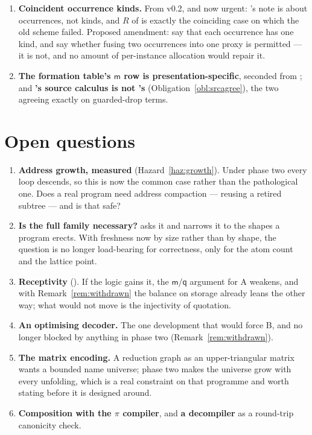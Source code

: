 \documentclass[11pt,a4paper]{article}
\newcommand{\mm}{\mathsf{m}}
\newcommand{\qq}{\mathsf{q}}
\theoremstyle{definition}
\theoremstyle{plain}
\begin{document}
\begin{enumerate}[leftmargin=1.8em]
\item \textbf{Coincident occurrence kinds.} From v0.2, and now urgent:
\cite[Table~1]{draft3}'s note is about occurrences, not kinds, and $R$ of
\cite[\S6.1]{draft3} is exactly the coinciding case on which the old scheme
failed. Proposed amendment: say that each occurrence has one kind, and say
whether fusing two occurrences into one proxy is permitted --- it is not, and
no amount of per-instance allocation would repair it.

\item \textbf{The formation table's $\mm$ row is presentation-specific},
seconded from \cite[Rem.~2.6]{logic}; and
\textbf{\cite[\S2]{draft3}'s source calculus is not
\cite[Def.~2.6]{k1ndl1ng}'s} (Obligation~\ref{obl:srcagree}), the two agreeing
exactly on guarded-drop terms.

\end{enumerate}

\section{Open questions}

\begin{enumerate}[leftmargin=1.8em]
\item \textbf{Address growth, measured} (Hazard~\ref{haz:growth}). Under phase
two every loop descends, so this is now the common case rather than the
pathological one. Does a real program need address compaction --- reusing a
retired subtree --- and is that safe?
\item \textbf{Is the full family necessary?} \cite[\S12]{draft3} asks it and
\cite[Rem.~6.15]{draft3} narrows it to the shapes a program erects. With
freshness now by size rather than by shape, the question is no longer
load-bearing for correctness, only for the atom count and the lattice point.
\item \textbf{Receptivity} (\cite[open item~5]{logic}). If the logic gains it,
the $\mm$/$\qq$ argument for A weakens, and with
Remark~\ref{rem:withdrawn} the balance on storage already leans the other way;
what would not move is the injectivity of quotation.
\item \textbf{An optimising decoder.} The one development that would force B,
and no longer blocked by anything in phase two (Remark~\ref{rem:withdrawn}).
\item \textbf{The matrix encoding.} A reduction graph as an upper-triangular
matrix wants a bounded name universe; phase two makes the universe grow with
every unfolding, which is a real constraint on that programme and worth
stating before it is designed around.
\item \textbf{Composition with the $\pi$ compiler}, and \textbf{a decompiler}
as a round-trip canonicity check.
\end{enumerate}
\end{document}
